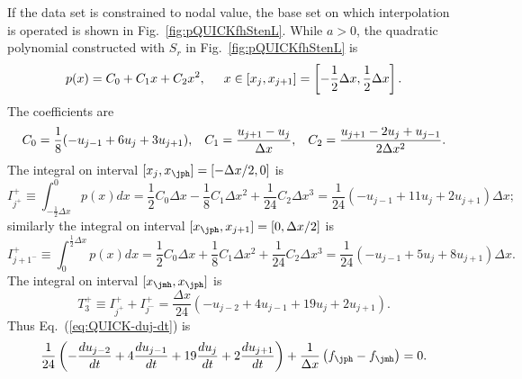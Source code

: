 \documentclass[]{article}
\begin{document}
If the data set is constrained to nodal value, the base set on which
interpolation is operated is shown in Fig.~\ref{fig:pQUICKfhStenL}. While
$a>0$, the quadratic polynomial constructed with $S_r$ in
Fig.~\ref{fig:pQUICKfhStenL} is
\begin{equation*}
  p(x) = C_0+C_1x+C_2x^2,\hspace{5mm} x\in [x_j,x_{j+1}]=\left[-\frac{1}{2}\Delta x,\frac{1}{2}\Delta x\right].
\end{equation*}
The coefficients are
\begin{equation*}
  C_0=\frac{1}{8}(-u_{j-1}+6u_j+3u_{j+1}),\hspace{3mm}
  C_1 = \frac{u_{j+1}-u_j}{\Delta x},\hspace{3mm}
  C_2 = \frac{u_{j+1}-2u_j+u_{j-1}}{2\Delta x^2}.
\end{equation*}
The integral on interval $[x_j,x_{\jph}]=[-\Delta x/2,0]$ is
\begin{equation*}
  I^+_{j^+}\equiv\int_{-\frac{1}{2}\Delta x}^0 p(x)dx = \frac{1}{2}C_0\Delta x-\frac{1}{8}C_1\Delta x^2+\frac{1}{24}C_2\Delta x^3
  =\frac{1}{24}(-u_{j-1}+11u_j+2u_{j+1})\Delta x;
\end{equation*}
similarly the integral on interval $[x_{\jph},x_{j+1}]=[0,\Delta x/2]$ is
\begin{equation*}
  I^+_{j+1^-}\equiv\int_0^{\frac{1}{2}\Delta x} p(x)dx = \frac{1}{2}C_0\Delta x+\frac{1}{8}C_1\Delta x^2+\frac{1}{24}C_2\Delta x^3
  =\frac{1}{24}(-u_{j-1}+5u_j+8u_{j+1})\Delta x.
\end{equation*}
The integral on interval $[x_{\jmh},x_{\jph}]$ is
\begin{equation*}
  T_3^+\equiv I^+_{j^+}+I^+_{j^-} = \frac{\Delta x}{24}(-u_{j-2}+4u_{j-1}+19u_j+2u_{j+1}).
\end{equation*}
Thus Eq.~(\ref{eq:QUICK-duj-dt}) is 
\begin{equation}
  \frac{1}{24}\left(-\frac{d u_{j-2}}{dt}+4\frac{du_{j-1}}{dt}+19\frac{du_j}{dt}+2\frac{du_{j+1}}{dt}\right)
  +\frac{1}{\Delta x}\left(f_{\jph}-f_{\jmh}\right)=0.
  \label{eq:intx1}
\end{equation}
\end{document}
